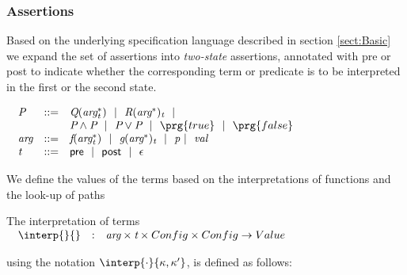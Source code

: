 { 




\subsubsection{Assertions}

Based on the underlying specification language described in section \ref{sect:Basic} we expand the set of assertions into {\em two-state} assertions,   annotated with  \textsf{pre} or  \textsf{post} to indicate whether the corresponding term or predicate is to be interpreted in the first or the second state.  

 
 

\begin{definition} $ ~ $ \\
\label{def:two-state-assertions}
$
\begin{array}{c}
\begin{array}{lcl}
 \textit{P}  & ::= &  \textit{Q}( \textit{arg}_{{\textit{t}}}^*)  \ \  | \ \   \textit{R}( \textit{arg}^*)_{{\textit{t}}} \ \  |   \\
 & &  \textit{P}   \wedge  \textit{P}   \  \  | \ \   \textit{P}  \vee  \textit{P} \ \ |   \ \   \prg{true} \ \ |   \ \   \prg{false}
 \\
  \textit{arg} &   ::= &   \textit{f}( \textit{arg}_{{\textit{t}}}^*) \ \  | \ \ \textit{g}( \textit{arg}^*)_{{\textit{t}}} \ \ | \ \ \textit{p}   \ | \ \  \textit{val}\ \
  \\
  {\textit{t}} &   ::= & \textsf{pre} \ \     | \ \ \textsf{post}  \ \ | \ \ \epsilon
\end{array}
\end{array}
$
\end{definition}
\noindent

 

We define the values of the terms based on the interpretations of functions and the look-up of paths
\begin{definition}[Interpretation]  
The interpretation of terms\\  
$
\begin{array}{c}
\begin{array}{lcl}
  \interp{}{} & : &  \textit{arg} \times   {\textit{t}} \times   Config   \times Config \rightarrow Value
\end{array}
\end{array}
$

\noindent
using the notation $\interp{\cdot}{\kappa,\kappa'}$, is defined as follows: \\


\end{definition}}
